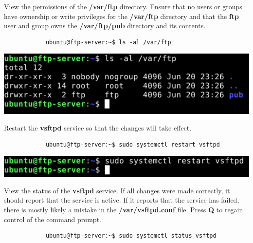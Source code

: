 \documentclass[letterpaper, 12pt]{article}
\begin{document}
\begin{enumerate}
    \begin{labstep}
        View the permissions of the \textbf{/var/ftp} directory.
        Ensure that no users or groups have ownership or write privileges for the \textbf{/var/ftp} directory and that the \textbf{ftp} user and group owns the \textbf{/var/ftp/pub} directory and its contents.
        \begin{lstlisting}
            ubuntu@ftp-server:~$ ls -al /var/ftp
        \end{lstlisting}

        \begin{center}
            \includegraphics[width=\linewidth]{images/part2/step14.png}
        \end{center}
    \end{labstep}

    \begin{labstep}
        Restart the \textbf{vsftpd} service so that the changes will take effect.
        \begin{lstlisting}
            ubuntu@ftp-server:~$ sudo systemctl restart vsftpd
        \end{lstlisting}

        \begin{center}
            \includegraphics[width=\linewidth]{images/part2/step15.png}
        \end{center}
    \end{labstep}

    \begin{labstep}
        View the status of the \textbf{vsftpd} service.
        If all changes were made correctly, it should report that the service is active.
        If it reports that the service has failed, there is mostly likely a mistake in the \textbf{/var/vsftpd.conf} file.
        Press \textbf{Q} to regain control of the command prompt.
        \begin{lstlisting}
            ubuntu@ftp-server:~$ sudo systemctl status vsftpd
        \end{lstlisting}


\end{labstep}
\end{enumerate}
\end{document}
